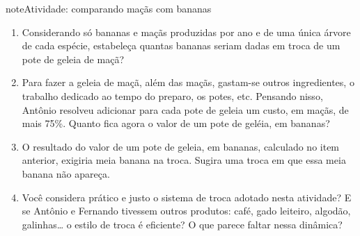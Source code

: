 \begin{sphinxadmonition}{note}{Atividade: comparando maçãs com bananas}
\begin{enumerate}
\item {} 
Considerando só bananas e maçãs produzidas por ano e de uma única árvore de cada espécie, estabeleça quantas bananas seriam dadas em troca de um pote de geleia de maçã?

\item {} 
Para fazer a geleia de maçã, além das maçãs, gastam-se outros ingredientes, o trabalho dedicado ao tempo do preparo, os potes, etc. Pensando nisso, Antônio resolveu adicionar para cada pote de geleia um custo, em maçãs, de mais 75\%. Quanto fica agora o valor de um pote de geléia, em bananas?

\item {} 
O resultado do valor de um pote de geleia, em bananas, calculado no item anterior, exigiria meia banana na troca. Sugira uma troca em que essa meia banana não apareça.

\item {} 
Você considera prático e justo o sistema de troca adotado nesta atividade? E se Antônio e Fernando tivessem outros produtos: café, gado leiteiro, algodão, galinhas… o estilo de troca é eficiente? O que parece faltar nessa dinâmica?

\end{enumerate}
\end{sphinxadmonition}

